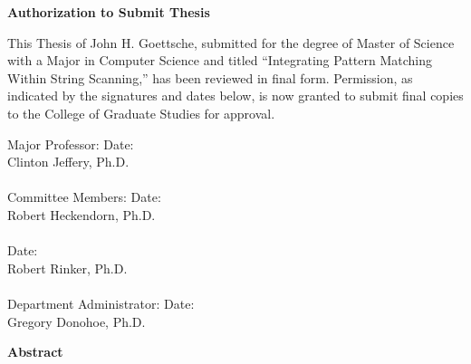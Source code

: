 \documentclass{article}
\begin{document}
\pagebreak
\large
\thispagestyle{fancy}
\begin{center}
\textbf{Authorization to Submit Thesis}
\end{center}
This Thesis of John H. Goettsche, submitted for the degree of Master of Science with a Major in Computer Science and titled ``Integrating Pattern Matching Within String Scanning,'' has been reviewed in final form.  Permission, as indicated by the signatures and dates below, is now granted to submit final copies to the College of Graduate Studies for approval.\\
\vspace{0.3in}
\begin{singlespace}
\noindent
	Major Professor:\hspace{0.8in}\makebox[2.5in]{\hrulefill} Date: \makebox[1.0in]{\hrulefill} \\
	\-\hspace{2.0in}Clinton Jeffery, Ph.D.\\
	\vspace{0.1in}\\
	Committee Members:\hspace{0.5in}\makebox[2.5in]{\hrulefill} Date: \makebox[1.0in]{\hrulefill} \\
	\-\hspace{2.0in}Robert Heckendorn, Ph.D.\\
	\vspace{0.1in}\\
	\-\hspace{2.0in}\makebox[2.5in]{\hrulefill} Date: \makebox[1.0in]{\hrulefill} \\
	\-\hspace{2.0in}Robert Rinker, Ph.D.\\
	\vspace{0.1in}\\
	Department Administrator: \makebox[2.5in]{\hrulefill} Date: \makebox[1.0in]{\hrulefill} \\
	\-\hspace{2.0in}Gregory Donohoe, Ph.D.\\
\end{singlespace}

\pagebreak

\begin{center}
\textbf{Abstract}
\end{center}
\end{document}
